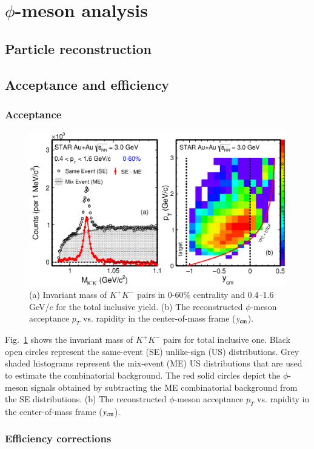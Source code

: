 \section{$\phi$-meson analysis} 
\subsection{Particle reconstruction}
\subsection{Acceptance and efficiency}
\subsubsection{Acceptance}

\begin{figure}[h]
\includegraphics[width=0.85\linewidth]{chapterY/fig/fig1_signal.eps}
  \caption{(a) Invariant mass of $K^+K^-$ pairs in 0-60\% centrality and 0.4--1.6\,GeV/$c$ for the total inclusive yield. (b) The reconstructed $\phi$-meson acceptance $p_T$ vs. rapidity in the center-of-mass frame ($y_{\rm cm}$).}
\label{phiSignal}
\end{figure}

Fig.~\ref{phiSignal} shows the invariant mass of $K^+K^-$ pairs for total inclusive one. Black open circles represent the same-event (SE) unlike-sign (US) distributions. Grey shaded histograms represent the mix-event (ME) US distributions that are used to estimate the combinatorial background. The red solid circles depict the $\phi$-meson signals obtained by subtracting the ME combinatorial background from the SE distributions. (b) The reconstructed $\phi$-meson acceptance $p_T$ vs. rapidity in the center-of-mass frame ($y_{\rm cm}$).


\subsubsection{Efficiency corrections}

